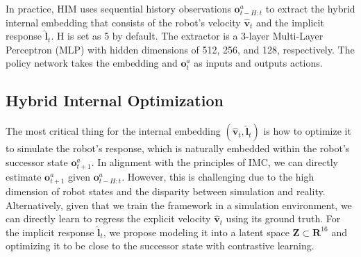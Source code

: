 In practice, HIM uses sequential history observations $\mathbf{o}_{t-H:t}^a$ to extract the hybrid internal embedding that consists of the robot's velocity $\hat{\mathbf{v}}_t$ and the implicit response $\mathbf{\hat{l}}_t$. H is set as 5 by default. 
The extractor is a 3-layer Multi-Layer Perceptron (MLP) with hidden dimensions of 512, 256, and 128, respectively.
The policy network takes the embedding and $\mathbf{o}_t^a$ as inputs and outputs actions. 


\subsection{Hybrid Internal Optimization}
The most critical thing for the internal embedding $(\hat{\mathbf{v}}_t, \mathbf{\hat{l}}_t)$ is how to optimize it to simulate the robot's response, which is naturally embedded within the robot's successor state $\mathbf{o}_{t+1}^{a}$.
In alignment with the principles of IMC, we can directly estimate $\mathbf{o}_{t+1}^a$ given $\mathbf{o}_{t-H:t}^a$.
However, this is challenging due to the high dimension of robot states and the disparity between simulation and reality.
Alternatively, given that we train the framework in a simulation environment, we can directly learn to regress the explicit velocity $\hat{\mathbf{v}}_t$ using its ground truth.
For the implicit response $\mathbf{\hat{l}}_t$, we propose modeling it into a latent space $\mathbf{Z} \subset \mathbf{R}^{16}$ and optimizing it to be close to the successor state with contrastive learning. 

